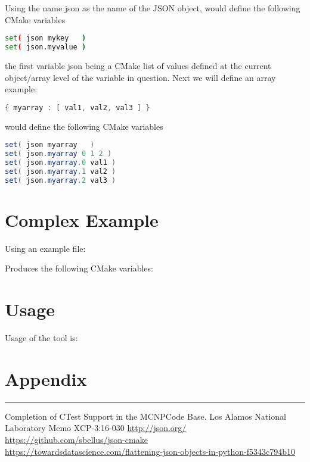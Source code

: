 \documentclass[12pt]{article}
\begin{document}
Using the name json as the name of the JSON object, would define the following CMake variables
\begin{lstlisting}[language=bash,basicstyle=\small,frame=single,columns=fullflexible]
set( json mykey   ) 
set( json.myvalue )
\end{lstlisting}
the first variable json being a CMake list of values defined at the current object/array level of the variable in question.
Next we will define an array example:
\begin{lstlisting}[language=java,basicstyle=\small,frame=single,columns=fullflexible]
{ myarray : [ val1, val2, val3 ] }
\end{lstlisting}
would define the following CMake variables
\begin{lstlisting}[language=java,basicstyle=\small,frame=single,columns=fullflexible]
set( json myarray   ) 
set( json.myarray 0 1 2 )
set( json.myarray.0 val1 ) 
set( json.myarray.1 val2 ) 
set( json.myarray.2 val3 ) 
\end{lstlisting}

\section{Complex Example}
Using an example file:

Produces the following CMake variables:

\section{Usage}
Usage of the tool is:

\newpage
\appendix
\newpage
\section{Appendix}

\rule{\linewidth}{1pt}
\begin{thebibliography}{9}
		 Completion of CTest Support in the MCNP\textregistered Code Base. Los Alamos National Laboratory Memo XCP-3:16-030
	 \url{http://json.org/}
 \url{https://github.com/sbellus/json-cmake}
	 \url{https://towardsdatascience.com/flattening-json-objects-in-python-f5343c794b10}
\end{thebibliography}
\end{document}
